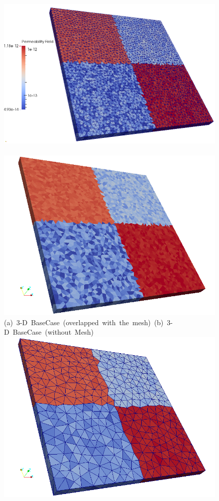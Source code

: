 \begin{landscape}
\begin{figure}[ht] 
\vbox{\vspace{-1cm}
\hspace{0.0cm} \hbox{\includegraphics[width=.8\textwidth]{./Pics/3D_BaseCase/3D_BaseCase_PermField_withMesh2.png}
      \includegraphics[width=.7\textwidth]{./Pics/3D_BaseCase/3D_BaseCase_PermField_withoutMesh.png}}
\vspace{0.cm}
\hbox{(a) 3-D BaseCase (overlapped with the mesh) \hspace{3.75cm} (b) 3-D BaseCase (without Mesh)}
\vspace{0.5cm}
\hbox{\includegraphics[width=.7\textwidth]{./Pics/3D_HOSVDCase/3D_HOSVDCase_PermField_withMesh.png}
}}
\end{figure}
\end{landscape}
